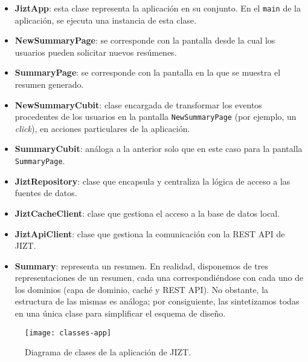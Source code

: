 \vspace{-0.2cm}
\begin{itemize} [\textbullet]
	\item \textbf{JiztApp}: esta clase representa la aplicación en su conjunto. En el \texttt{main} de la aplicación, se ejecuta una instancia de esta clase.
	
	\item \textbf{NewSummaryPage}: se corresponde con la pantalla desde la cual los usuarios pueden solicitar nuevos resúmenes.
	
	\item \textbf{SummaryPage}: se corresponde con la pantalla en la que se muestra el resumen generado.
	
	\item \textbf{NewSummaryCubit}: clase encargada de transformar los eventos procedentes de los usuarios en la pantalla \texttt{NewSummaryPage} (por ejemplo, un \emph{click}), en acciones particulares de la aplicación.
	
	\item \textbf{SummaryCubit}: análoga a la anterior solo que en este caso para la pantalla \texttt{SummaryPage}.
	
	\item \textbf{JiztRepository}: clase que encapsula y centraliza la lógica de acceso a las fuentes de datos.
	
	\item \textbf{JiztCacheClient}: clase que gestiona el acceso a la base de datos local.
	
	\item \textbf{JiztApiClient}: clase que gestiona la comunicación con la REST API de JIZT.
	
	\item \textbf{Summary}: representa un resumen. En realidad, disponemos de tres representaciones de un resumen, cada una correspondiéndose con cada uno de los dominios (capa de dominio, caché y REST API). No obstante, la estructura de las mismas es análoga; por consiguiente, las sintetizamos todas en una única clase para simplificar el esquema de diseño.
\end{itemize}


\begin{figure}[h]
	\centering
	\texttt{[image: classes-app]}
	\vspace{-0.5cm}
	\caption{Diagrama de clases de la aplicación de JIZT.}
\end{figure}


